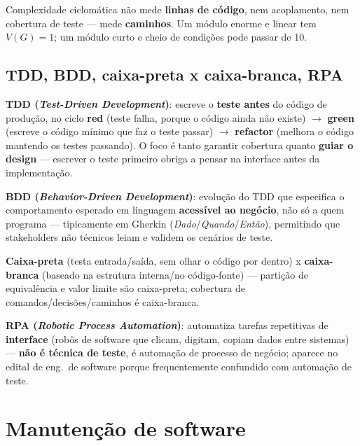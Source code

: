 \begin{cuidado}
Complexidade ciclomática não mede \textbf{linhas de código}, nem
acoplamento, nem cobertura de teste --- mede \textbf{caminhos}. Um módulo
enorme e linear tem $V(G) = 1$; um módulo curto e cheio de condições pode
passar de 10.
\end{cuidado}

\subsection{TDD, BDD, caixa-preta x caixa-branca, RPA}

\begin{conceito}
\textbf{TDD (\textit{Test-Driven Development})}: escreve o \textbf{teste
antes} do código de produção, no ciclo \textbf{red} (teste falha, porque o
código ainda não existe) $\to$ \textbf{green} (escreve o código mínimo que
faz o teste passar) $\to$ \textbf{refactor} (melhora o código mantendo os
testes passando). O foco é tanto garantir cobertura quanto \textbf{guiar o
design} --- escrever o teste primeiro obriga a pensar na interface antes da
implementação.

\textbf{BDD (\textit{Behavior-Driven Development})}: evolução do TDD que
especifica o comportamento esperado em linguagem \textbf{acessível ao
negócio}, não só a quem programa --- tipicamente em Gherkin
(\textit{Dado}/\textit{Quando}/\textit{Então}), permitindo que
stakeholders não técnicos leiam e validem os cenários de teste.

\textbf{Caixa-preta} (testa entrada/saída, sem olhar o código por dentro) x
\textbf{caixa-branca} (baseado na estrutura interna/no código-fonte) ---
partição de equivalência e valor limite são caixa-preta; cobertura de
comandos/decisões/caminhos é caixa-branca.

\textbf{RPA (\textit{Robotic Process Automation})}: automatiza tarefas
repetitivas de \textbf{interface} (robôs de software que clicam, digitam,
copiam dados entre sistemas) --- \textbf{não é técnica de teste}, é
automação de processo de negócio; aparece no edital de eng.\ de software
porque frequentemente confundido com automação de teste.
\end{conceito}

\section{Manutenção de software}

